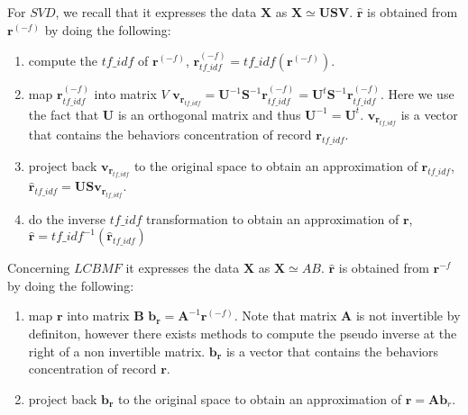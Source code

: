 For $SVD$, we recall that it expresses the data $\boldsymbol{X}$ as $\boldsymbol{X}\simeq \boldsymbol{U}\boldsymbol{S}\boldsymbol{V}$. $\mathbf{\widehat{r}}$ is obtained from $\mathbf{r}^{(-f)}$ by doing the following:
\begin{enumerate} 
	\item compute the $tf\_idf$ of $\mathbf{r}^{(-f)}$, $\mathbf{r}_{tf\_idf}^{(-f)}=tf\_idf(\mathbf{r}^{(-f)})$.
	\item map $\mathbf{r}_{tf\_idf}^{(-f)}$ into matrix $V$ $\boldsymbol{v}_{\boldsymbol{r}_{tf\_idf}}=\boldsymbol{U}^{-1}\boldsymbol{S}^{-1}\boldsymbol{r}_{tf\_idf}^{(-f)}=\boldsymbol{U}^{t}\boldsymbol{S}^{-1}\boldsymbol{r}_{tf\_idf}^{(-f)}		$. Here we use the fact that $\boldsymbol{U}$ is an orthogonal matrix and thus $\boldsymbol{U}^{-1}=\boldsymbol{U}^{t}$. $\boldsymbol{v}_{\boldsymbol{r}_{tf\_idf}}$ is a vector that contains the behaviors concentration of 			record $\mathbf{r}_{tf\_idf}$.
	\item project back $\boldsymbol{v}_{\boldsymbol{r}_{tf\_idf}}$ to the original space to obtain an approximation of $\mathbf{r}_{tf\_idf}$, $\mathbf{\widehat{r}}_{tf\_idf} = \boldsymbol{U}\boldsymbol{S}\boldsymbol{v}_{\boldsymbol{r}_{tf		\_idf}}$.
	\item do the inverse $tf\_idf$ transformation to obtain an approximation of $\mathbf{r}$, $\mathbf{\widehat{r}} = tf\_idf^{-1}(\mathbf{\widehat{r}}_{tf\_idf})$	
\end{enumerate} \par

Concerning $LCBMF$ it expresses the data $\boldsymbol{X}$ as $\boldsymbol{X}\simeq AB$. $\mathbf{\widehat{r}}$ is obtained from $\mathbf{r}^{-f}$ by doing the following:
\begin{enumerate} 
	\item map $\mathbf{r}$ into matrix $\boldsymbol{B}$ $\boldsymbol{b}_{\boldsymbol{r}}=\boldsymbol{A}^{-1}\boldsymbol{r}^{(-f)}$. Note that matrix $\boldsymbol{A}$ is not invertible by definiton, however there exists methods to 			compute the pseudo inverse at 	the right of a non invertible matrix. $\boldsymbol{b}_{\boldsymbol{r}}$ is a vector that contains the behaviors concentration of record $\mathbf{r}$.
	\item project back $\boldsymbol{b}_{\boldsymbol{r}}$ to the original space to obtain an approximation of $\mathbf{\widehat{r}} = \boldsymbol{A}\boldsymbol{b}_{r}$.
\end{enumerate}
	

